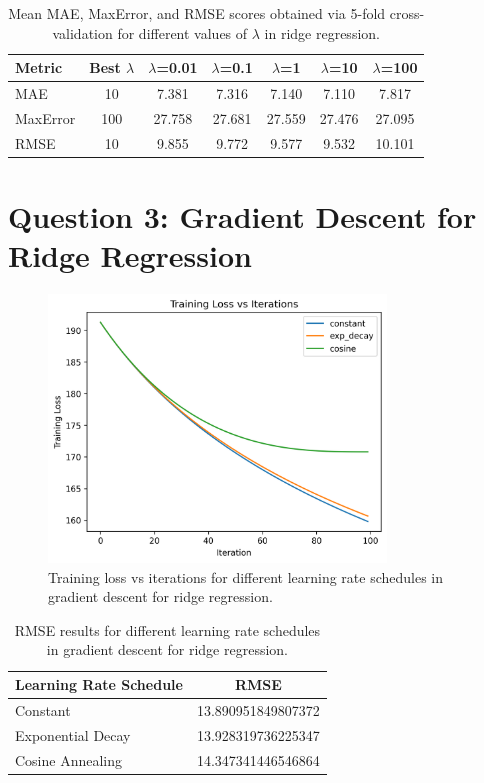\documentclass[11pt, a4paper]{report}
\begin{document}
\begin{table}[h!]
\centering
\begin{tabular}{|l|c|c|c|c|c|c|}
\hline
\textbf{Metric} & \textbf{Best $\lambda$} & \textbf{$\lambda$=0.01} & \textbf{$\lambda$=0.1} & \textbf{$\lambda$=1} & \textbf{$\lambda$=10} & \textbf{$\lambda$=100} \\
\hline
MAE & 10 & 7.381 & 7.316 & 7.140 & 7.110 & 7.817 \\
\hline
MaxError & 100 & 27.758 & 27.681 & 27.559 & 27.476 & 27.095 \\
\hline
RMSE & 10 & 9.855 & 9.772 & 9.577 & 9.532 & 10.101 \\
\hline
\end{tabular}
\caption{Mean MAE, MaxError, and RMSE scores obtained via 5-fold cross-validation for different values of $\lambda$ in ridge regression.}
\label{tab:cross_validation_results}
\end{table}

\section{Question 3: Gradient Descent for Ridge Regression}

\begin{figure}[h!]
    \centering
    \includegraphics[width=0.8\textwidth]{./assets/training_loss_comparison.png}
    \caption{Training loss vs iterations for different learning rate schedules in gradient descent for ridge regression.}
    \label{fig:training_loss_comparison}
\end{figure}

\begin{table}[h!]
\centering
\begin{tabular}{|l|c|}
\hline
\textbf{Learning Rate Schedule} & \textbf{RMSE} \\
\hline
Constant & 13.890951849807372 \\
\hline
Exponential Decay & 13.928319736225347 \\
\hline
Cosine Annealing & 14.347341446546864 \\
\hline
\end{tabular}
\caption{RMSE results for different learning rate schedules in gradient descent for ridge regression.}
\label{tab:learning_rate_schedules}
\end{table}
\end{document}
